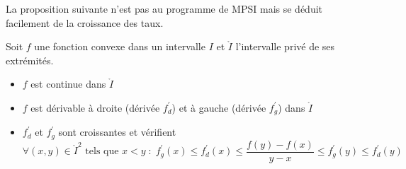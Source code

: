 La proposition suivante n'est pas au programme de MPSI mais se déduit facilement de la croissance des taux.
\begin{prop}
 Soit $f$ une fonction convexe dans un intervalle $I$ et $\mathring{I}$ l'intervalle privé de ses extrémités.
\begin{itemize}
 \item $f$ est continue dans $\mathring{I}$
 \item $f$ est dérivable à droite (dérivée $f_d^\prime$) et à gauche (dérivée $f_g^\prime$) dans $\mathring{I}$
 \item $f_d^\prime$ et $f_g^\prime$ sont croissantes et vérifient
\begin{displaymath}
 \forall (x,y)\in \mathring{I}^2 \text{ tels que } x<y \;:\;
f_g^\prime(x)\leq f_d^\prime(x) \leq \dfrac{f(y)-f(x)}{y-x} \leq f_g^\prime(y) \leq f_d^\prime(y)
\end{displaymath}

\end{itemize}

\end{prop}

